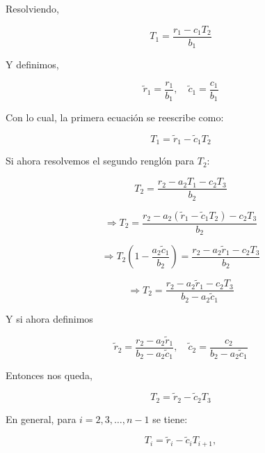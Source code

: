 \documentclass[11pt,a4paper]{article}
\begin{document}
Resolviendo,

\begin{equation}
T_1 = \frac{r_1 - c_1 T_2}{b_1}
\end{equation}

Y definimos,

\begin{equation}
\tilde{r}_1 = \frac{r_1}{b_1}, \quad \tilde{c}_1 = \frac{c_1}{b_1}
\label{eq:tri_factor_init1}
\end{equation}

Con lo cual, la primera ecuaci\'on se reescribe como:

\begin{equation}
T_1 = \tilde{r}_1 - \tilde{c}_1 T_2
\end{equation}

Si ahora resolvemos el segundo rengl\'on para $T_2$:

\begin{equation}
T_2 = \frac{r_2 - a_2 T_1 - c_2 T_3}{b_2}
\end{equation}

\begin{equation}
\Rightarrow T_2 = \frac{r_2 - a_2 (\tilde{r}_1 - \tilde{c}_1 T_2) - c_2 T_3}{b_2}
\end{equation}

\begin{equation}
\Rightarrow T_2 \left(1 - \frac{a_2 \tilde{c}_1}{b_2}\right) = \frac{r_2 - a_2 \tilde{r}_1 - c_2 T_3}{b_2}
\end{equation}

\begin{equation}
\Rightarrow T_2 = \frac{r_2 - a_2 \tilde{r}_1 - c_2 T_3}{b_2 - a_2 \tilde{c}_1}
\end{equation}

Y si ahora definimos 

\begin{equation}
\tilde{r}_2 = \frac{r_2 - a_2 \tilde{r}_1}{b_2 - a_2 \tilde{c}_1}, \quad 
\tilde{c}_2 = \frac{c_2}{b_2 - a_2 \tilde{c}_1}
\label{eq:tri_factor_init2}
\end{equation}

Entonces nos queda,

\begin{equation}
T_2 = \tilde{r}_2 - \tilde{c}_2 T_3
\end{equation}

En general, para $i=2,3,\ldots,n-1$ se tiene:

\begin{equation}
T_i = \tilde{r}_i - \tilde{c}_i T_{i+1},
\end{equation}
\end{document}
